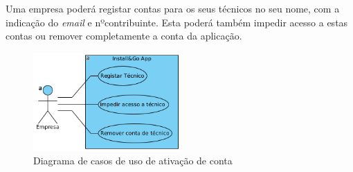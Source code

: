 Uma empresa poderá registar contas para os seus técnicos no seu nome, com a indicação do \textit{email} e nºcontribuinte. Esta poderá também impedir acesso a estas contas ou remover completamente a conta da aplicação.

\begin{figure}[htb]
    \centering
    \includegraphics[width=0.5\textwidth]{images/diagramas/casos_de_uso/use_case_rec_humanos.png}
    \caption{Diagrama de casos de uso de ativação de conta}
    \label{fig:19}
\end{figure}